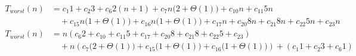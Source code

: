 \begin{subequations}
\label{eq:findchainoflines}
\begin{align}
\label{eq:findchainoflines-1}
T_{worst}(n)& =
c_{1}1
+ c_{2}3
+ c_{6}2(n+1)
+ c_{7}n\bigl(2 + \Theta(1)\bigr)
+ c_{10}n
+ c_{11}5n
\\
& \quad
+ c_{15}n\bigl(1 + \Theta(1)\bigr)
+ c_{16}n\bigl(1 + \Theta(1)\bigr)
+ c_{17}n
+ c_{20}8n
+ c_{21}8n
+ c_{22}5n
+ c_{23}n
\nonumber \\
\label{eq:findchainoflines-2}
T_{worst}(n)& =
n(c_{6}2 + c_{10} + c_{11}5 + c_{17} + c_{20}8 + c_{21}8 + c_{22}5 + c_{23})
\\
& \quad
+ n(c_{7}\bigl(2 + \Theta(1)\bigr) + c_{15}\bigl(1 + \Theta(1)\bigr) + c_{16}\bigl(1 + \Theta(1)\bigr))
+ (c_{1}1 + c_{2}3 + c_{6}1)
\nonumber
\end{align}
\end{subequations}
